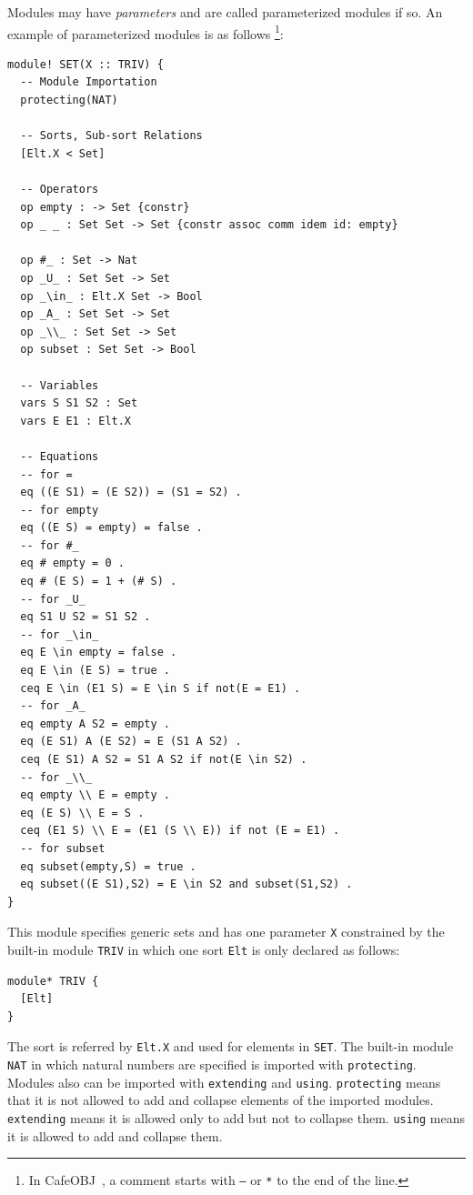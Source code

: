 \documentclass[12pt]{report}
\newcommand{\cafeobj}{{\sf CafeOBJ}~}
\begin{document}
Modules may have {\it parameters} and are called parameterized modules
if so. An example of parameterized modules is as follows
\footnote{In \cafeobj, a comment starts with {\tt --} or {\tt **} to
  the end of the line.}:
\begin{verbatim}
module! SET(X :: TRIV) {
  -- Module Importation
  protecting(NAT)

  -- Sorts, Sub-sort Relations
  [Elt.X < Set]

  -- Operators
  op empty : -> Set {constr}
  op _ _ : Set Set -> Set {constr assoc comm idem id: empty}

  op #_ : Set -> Nat
  op _U_ : Set Set -> Set
  op _\in_ : Elt.X Set -> Bool
  op _A_ : Set Set -> Set
  op _\\_ : Set Set -> Set
  op subset : Set Set -> Bool

  -- Variables
  vars S S1 S2 : Set
  vars E E1 : Elt.X

  -- Equations
  -- for =
  eq ((E S1) = (E S2)) = (S1 = S2) .
  -- for empty
  eq ((E S) = empty) = false .
  -- for #_
  eq # empty = 0 .   
  eq # (E S) = 1 + (# S) . 
  -- for _U_
  eq S1 U S2 = S1 S2 .
  -- for _\in_
  eq E \in empty = false .
  eq E \in (E S) = true .
  ceq E \in (E1 S) = E \in S if not(E = E1) .
  -- for _A_
  eq empty A S2 = empty .
  eq (E S1) A (E S2) = E (S1 A S2) .
  ceq (E S1) A S2 = S1 A S2 if not(E \in S2) .
  -- for _\\_ 
  eq empty \\ E = empty .
  eq (E S) \\ E = S .
  ceq (E1 S) \\ E = (E1 (S \\ E)) if not (E = E1) .
  -- for subset
  eq subset(empty,S) = true .
  eq subset((E S1),S2) = E \in S2 and subset(S1,S2) .
}
\end{verbatim}
This module specifies generic sets and has one parameter {\tt X}
constrained by the built-in module {\tt TRIV} in which one sort
{\tt Elt} is only declared as follows:
\begin{verbatim}
module* TRIV {
  [Elt]
}
\end{verbatim}
The sort is referred by {\tt Elt.X} and used for elements in
{\tt SET}. The built-in module {\tt NAT} in which natural numbers are
specified is imported with {\tt protecting}. Modules also can be
imported with {\tt extending} and {\tt using}. {\tt protecting} means
that it is not allowed to add and collapse elements of the imported
modules.  {\tt extending} means it is allowed only to add but not to
collapse them. {\tt using} means it is allowed to add and collapse
them.
\end{document}
